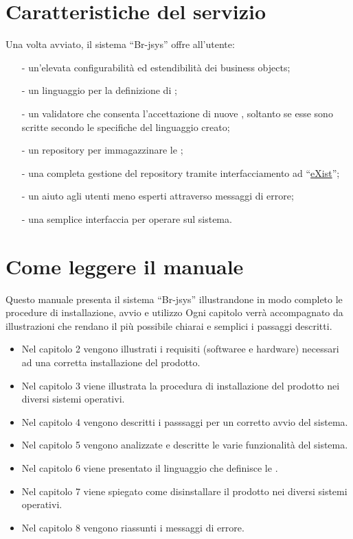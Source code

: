 \section{Caratteristiche del servizio}
Una volta avviato, il sistema ``Br-jsys'' offre all'utente:
\begin{itemize}
\item[-] un'elevata configurabilit\`a ed estendibilit\`a dei business objects;
\item[-] un linguaggio per la definizione di \br;
\item[-] un validatore che consenta l'accettazione di nuove \br, soltanto se esse sono scritte secondo le specifiche del linguaggio creato;
\item[-] un repository per immagazzinare le \br;
\item[-] una completa gestione del repository tramite interfacciamento ad ``\underline{eXist}'';
\item[-] un aiuto agli utenti meno esperti attraverso  messaggi di errore;
\item[-] una semplice interfaccia per operare sul sistema.
\end{itemize}

\section{Come leggere il manuale}
 Questo manuale presenta il sistema ``Br-jsys'' illustrandone in modo completo le procedure di installazione, avvio e utilizzo 
Ogni capitolo verr\`a accompagnato da illustrazioni che rendano il pi\`u possibile chiarai e semplici i passaggi descritti.
 \begin{itemize}
 \item Nel capitolo 2 vengono illustrati i requisiti (softwaree e hardware) necessari ad una corretta installazione del prodotto.
\item Nel capitolo 3 viene illustrata la procedura di installazione del prodotto nei diversi sistemi operativi.
\item Nel capitolo 4 vengono descritti i passsaggi per un corretto avvio del sistema.
\item Nel capitolo 5 vengono analizzate e descritte le varie funzionalit\`a del sistema.
\item Nel capitolo 6 viene presentato il linguaggio che definisce le \br.
\item Nel capitolo 7 viene spiegato come disinstallare il prodotto nei diversi sistemi operativi.
\item Nel capitolo 8 vengono riassunti i messaggi di errore.
 \end{itemize}


